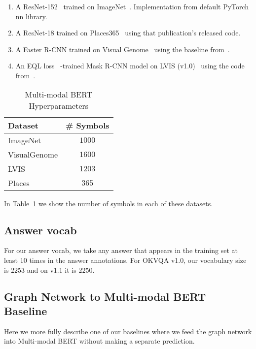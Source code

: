 \documentclass[final]{cvpr}
\providecommand{\MMBERTBase}{Multi-modal BERT\xspace}
\begin{document}
\begin{enumerate}
    \item A ResNet-152~\cite{he2016deep} trained on ImageNet~\cite{ILSVRC15}. Implementation from default PyTorch~\cite{paszke2019pytorch} nn library.
    \item A ResNet-18 trained on Places365~\cite{zhou2017places} using that publication's released code. 
    \item A Faster R-CNN trained on Visual Genome~\cite{krishnavisualgenome} using the baseline from~\cite{jiang2020defense}.
    \item An EQL loss~\cite{tan2020equalization} -trained Mask R-CNN model on LVIS (v1.0)~\cite{gupta2019lvis} using the code from~\cite{tan2020equalization}.
\end{enumerate}

\begin{table}[h]
\begin{center}
\begin{tabular}{@{}lc@{}}
\toprule
Dataset & \# Symbols\\ \midrule
ImageNet& $1000$ \\
VisualGenome & $1600$ \\
LVIS & $1203$ \\
Places & $365$ \\
\bottomrule
\end{tabular}
\end{center}
\caption{\MMBERTBase Hyperparameters}
\label{table:datasetsize}
\end{table}

In Table~\ref{table:datasetsize} we show the number of symbols in each of these datasets.


\subsection{Answer vocab}
\label{appx:ansvocab}
For our answer vocab, we take any answer that appears in the training set at least $10$ times in the answer annotations. For OKVQA v1.0, our vocabulary size is $2253$ and on v1.1 it is $2250$.

\subsection{Graph Network to \MMBERTBase Baseline}
\label{appx:gntovbbaseline}
Here we more fully describe one of our baselines where we feed the graph network into \MMBERTBase without making a separate prediction.
\end{document}
